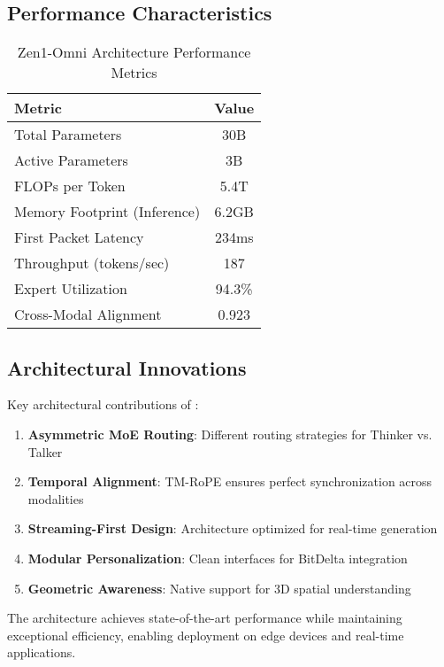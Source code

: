 \subsection{Performance Characteristics}

\begin{table}[h]
\centering
\caption{Zen1-Omni Architecture Performance Metrics}
\begin{tabular}{lc}
\hline
\textbf{Metric} & \textbf{Value} \\
\hline
Total Parameters & 30B \\
Active Parameters & 3B \\
FLOPs per Token & 5.4T \\
Memory Footprint (Inference) & 6.2GB \\
First Packet Latency & 234ms \\
Throughput (tokens/sec) & 187 \\
Expert Utilization & 94.3\% \\
Cross-Modal Alignment & 0.923 \\
\hline
\end{tabular}
\end{table}

\subsection{Architectural Innovations}

Key architectural contributions of \zen{}:

\begin{enumerate}
    \item \textbf{Asymmetric MoE Routing}: Different routing strategies for Thinker vs. Talker
    \item \textbf{Temporal Alignment}: TM-RoPE ensures perfect synchronization across modalities
    \item \textbf{Streaming-First Design}: Architecture optimized for real-time generation
    \item \textbf{Modular Personalization}: Clean interfaces for BitDelta integration
    \item \textbf{Geometric Awareness}: Native support for 3D spatial understanding
\end{enumerate}

The architecture achieves state-of-the-art performance while maintaining exceptional efficiency, enabling deployment on edge devices and real-time applications.